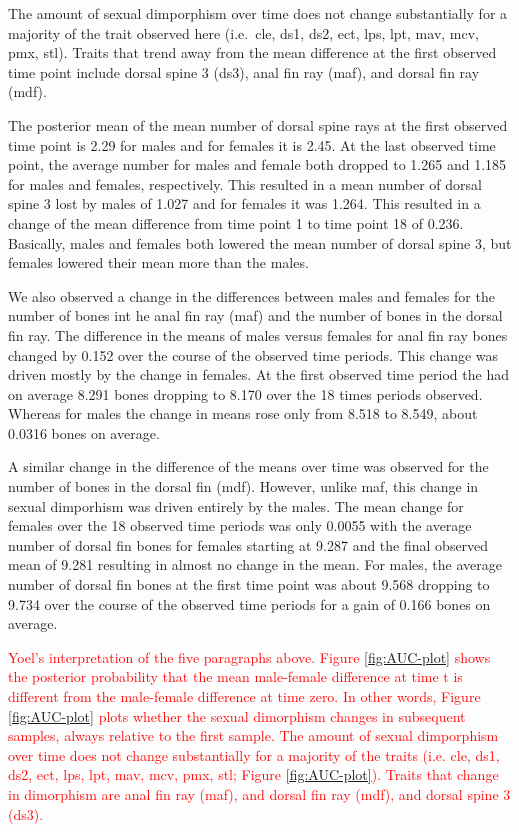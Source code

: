 \documentclass[
  12pt,
]{article}
\begin{document}
The amount of sexual dimporphism over time does not change substantially
for a majority of the trait observed here (i.e.~cle, ds1, ds2, ect, lps,
lpt, mav, mcv, pmx, stl). Traits that trend away from the mean
difference at the first observed time point include dorsal spine 3
(ds3), anal fin ray (maf), and dorsal fin ray (mdf).

The posterior mean of the mean number of dorsal spine rays at the first
observed time point is 2.29 for males and for females it is 2.45. At the
last observed time point, the average number for males and female both
dropped to 1.265 and 1.185 for males and females, respectively. This
resulted in a mean number of dorsal spine 3 lost by males of 1.027 and
for females it was 1.264. This resulted in a change of the mean
difference from time point 1 to time point 18 of 0.236. Basically, males
and females both lowered the mean number of dorsal spine 3, but females
lowered their mean more than the males.

We also observed a change in the differences between males and females
for the number of bones int he anal fin ray (maf) and the number of
bones in the dorsal fin ray. The difference in the means of males versus
females for anal fin ray bones changed by 0.152 over the course of the
observed time periods. This change was driven mostly by the change in
females. At the first observed time period the had on average 8.291
bones dropping to 8.170 over the 18 times periods observed. Whereas for
males the change in means rose only from 8.518 to 8.549, about 0.0316
bones on average.

A similar change in the difference of the means over time was observed
for the number of bones in the dorsal fin (mdf). However, unlike maf,
this change in sexual dimporhism was driven entirely by the males. The
mean change for females over the 18 observed time periods was only
0.0055 with the average number of dorsal fin bones for females starting
at 9.287 and the final observed mean of 9.281 resulting in almost no
change in the mean. For males, the average number of dorsal fin bones at
the first time point was about 9.568 dropping to 9.734 over the course
of the observed time periods for a gain of 0.166 bones on average.

\textcolor{red} {
Yoel's interpretation of the five paragraphs above. 
Figure \ref{fig:AUC-plot} shows the posterior probability that the mean male-female difference at time t is different from the male-female difference at time zero. In other words, Figure \ref{fig:AUC-plot} plots whether the sexual dimorphism changes in subsequent samples, always relative to the first sample. The amount of sexual dimporphism over time does not change substantially for a majority of the traits (i.e. cle, ds1, ds2, ect, lps, lpt, mav, mcv, pmx, stl; Figure \ref{fig:AUC-plot}). Traits that change in dimorphism are anal fin ray (maf), and dorsal fin ray (mdf), and dorsal spine 3 (ds3).}
\end{document}
